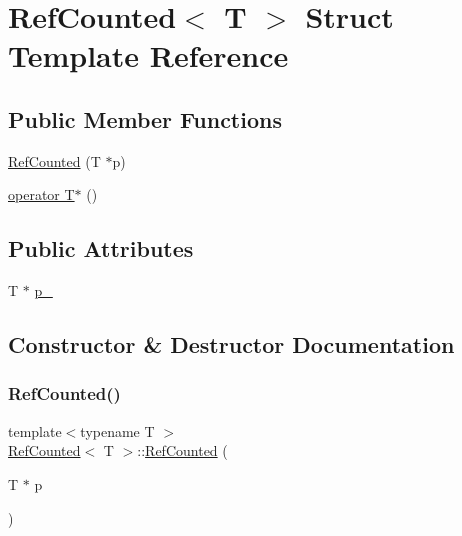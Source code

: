 \hypertarget{structRefCounted}{}\section{Ref\+Counted$<$ T $>$ Struct Template Reference}
\label{structRefCounted}
\subsection*{Public Member Functions}
\begin{DoxyCompactItemize}
\item 
\hyperlink{structRefCounted_a8bf5bb3a0224a47321f037c7fd67dd7e}{Ref\+Counted} (T $\ast$p)
\item 
\hyperlink{structRefCounted_af2c476a22394d788e365eb7d2bb38fe8}{operator T$\ast$} ()
\end{DoxyCompactItemize}
\subsection*{Public Attributes}
\begin{DoxyCompactItemize}
\item 
T $\ast$ \hyperlink{structRefCounted_a5486e2d0954f6462a8619cabfaf8fb27}{p\+\_\+}
\end{DoxyCompactItemize}


\subsection{Constructor \& Destructor Documentation}
\mbox{\label{structRefCounted_a8bf5bb3a0224a47321f037c7fd67dd7e}} 
\subsubsection{\texorpdfstring{Ref\+Counted()}{RefCounted()}}
{\footnotesize\ttfamily template$<$typename T $>$ \\
\hyperlink{structRefCounted}{Ref\+Counted}$<$ T $>$\+::\hyperlink{structRefCounted}{Ref\+Counted} (\begin{DoxyParamCaption}\item[{T $\ast$}]{p }\end{DoxyParamCaption})\hspace{0.3cm}{\ttfamily [inline]}}



